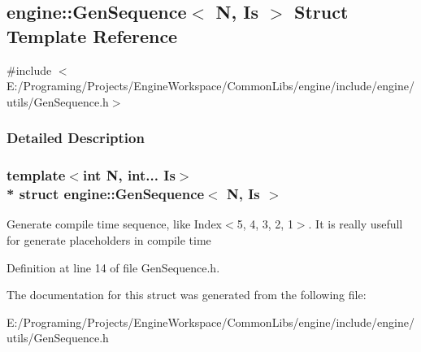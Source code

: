 \hypertarget{a00040}{}\subsection{engine\+:\+:Gen\+Sequence$<$ N, Is $>$ Struct Template Reference}
\label{a00040}


{\ttfamily \#include $<$E\+:/\+Programing/\+Projects/\+Engine\+Workspace/\+Common\+Libs/engine/include/engine/utils/\+Gen\+Sequence.\+h$>$}



\subsubsection{Detailed Description}
\subsubsection*{template$<$int N, int... Is$>$\\*
struct engine\+::\+Gen\+Sequence$<$ N, Is $>$}

Generate compile time sequence, like Index$<$5, 4, 3, 2, 1$>$. It is really usefull for generate placeholders in compile time 

Definition at line 14 of file Gen\+Sequence.\+h.



The documentation for this struct was generated from the following file\+:\begin{DoxyCompactItemize}
\item 
E\+:/\+Programing/\+Projects/\+Engine\+Workspace/\+Common\+Libs/engine/include/engine/utils/Gen\+Sequence.\+h\end{DoxyCompactItemize}
